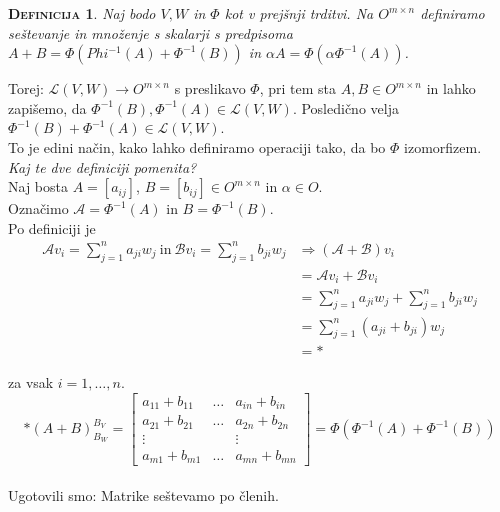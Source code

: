 \documentclass[a4paper,12pt]{article}
\newtheorem*{definicija}{\textsc{Definicija}}
\begin{document}
\begin{definicija}
	Naj bodo $V,W$ in $\Phi$ kot v prejšnji trditvi. Na $O^{m\times n}$ definiramo seštevanje in množenje s skalarji s predpisoma $A+B=\Phi(Phi^{-1}(A)+\Phi^{-1}(B))$ in $\alpha A=\Phi(\alpha \Phi^{-1}(A))$. \\
\end{definicija}

Torej: $\mathcal{L}(V,W) \to O^{m\times n}$ s preslikavo $\Phi$, pri tem sta $A,B\in O^{m\times n}$ in lahko zapišemo, da $\Phi^{-1}(B), \Phi^{-1}(A) \in \mathcal{L}(V,W)$. Posledično velja $\Phi^{-1}(B)+\Phi^{-1}(A) \in \mathcal{L}(V,W)$. \\

To je edini način, kako lahko definiramo operaciji tako, da bo $\Phi$ izomorfizem.\\

\textit{Kaj te dve definiciji pomenita?}\\

Naj bosta $A=[a_{ij}]$, $B=[b_{ij}] \in O^{m\times n}$ in $\alpha \in O$. \\

Označimo $\mathcal{A}=\Phi^{-1}(A)$ in $B=\Phi^{-1}(B)$. \\

Po definiciji je
\begin{align*}
	 \mathcal{A}v_i=\sum_{j=1}^n a_{ji}w_j~\text{in}~\mathcal{B}v_i=\sum_{j=1}^n b_{ji}w_j &\Rightarrow (\mathcal{A}+\mathcal{B})v_i \\
	 &=\mathcal{A}v_i + \mathcal{B}v_i \\
	 &= \sum_{j=1}^n a_{ji}w_j + \sum_{j=1}^n
b_{ji}w_j \\
	&= \sum_{j=1}^n(a_{ji}+b_{ji})w_j \\
	&= *
\end{align*}

za vsak $i=1,\ldots,n$. \\

$$* (A+B)^{B_V}_{B_W}=
\begin{bmatrix}
	a_{11}+b_{11}&\ldots&a_{in}+b_{in} \\
	a_{21}+b_{21}&\ldots&a_{2n}+b_{2n} \\
	\vdots&~&\vdots \\
	a_{m1}+b_{m1}&\ldots&a_{mn}+b_{mn}
\end{bmatrix} 
= \Phi(\Phi^{-1}(A)+\Phi^{-1}(B))$$ \\

Ugotovili smo: Matrike seštevamo po členih. \\
\end{document}
